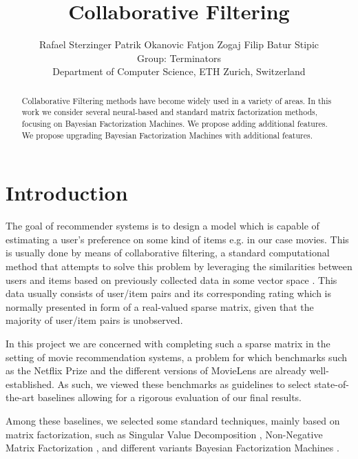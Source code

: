\documentclass[10pt,conference,compsocconf]{IEEEtran}
\newcommand{\spacing}{\hspace{1cm}}
\begin{document}
    \title{Collaborative Filtering}

    \author{
    Rafael Sterzinger \spacing Patrik Okanovic \spacing Fatjon Zogaj \spacing Filip Batur Stipic\\
    Group: Terminators\\
    Department of Computer Science, ETH Zurich, Switzerland
    }

    \maketitle

    \begin{abstract}
        Collaborative Filtering methods have become widely used in a variety of areas. In this work we consider several neural-based and standard matrix factorization methods, focusing on Bayesian Factorization Machines. We propose adding additional features. We propose upgrading Bayesian Factorization Machines with additional features.

    \end{abstract}


    \section{Introduction}

    The goal of recommender systems is to design a model which is capable of estimating a user's preference on some kind of items e.g. in our case movies.
    This is usually done by means of collaborative filtering, a standard computational method that attempts to solve this problem by leveraging the similarities between users and items based on previously collected data in some vector space \cite{CF_survey}.
    This data usually consists of user/item pairs and its corresponding rating which is normally presented in form of a real-valued sparse matrix, given that the majority of user/item pairs is unobserved.

    In this project we are concerned with completing such a sparse matrix in the setting of movie recommendation systems, a problem for which benchmarks such as the Netflix Prize \cite{Netflix} and the different versions of MovieLens \cite{Movielens} are already well-established.
    As such, we viewed these benchmarks as guidelines to select state-of-the-art baselines allowing for a rigorous evaluation of our final results.

    Among these baselines, we selected some standard techniques, mainly based on matrix factorization, such as Singular Value Decomposition \cite{svd}, Non-Negative Matrix Factorization \cite{6165290}, and different variants Bayesian Factorization Machines \cite{freudenthaler_bayesian_2011, salakhutdinov_bayesian_2008}.
\end{document}
